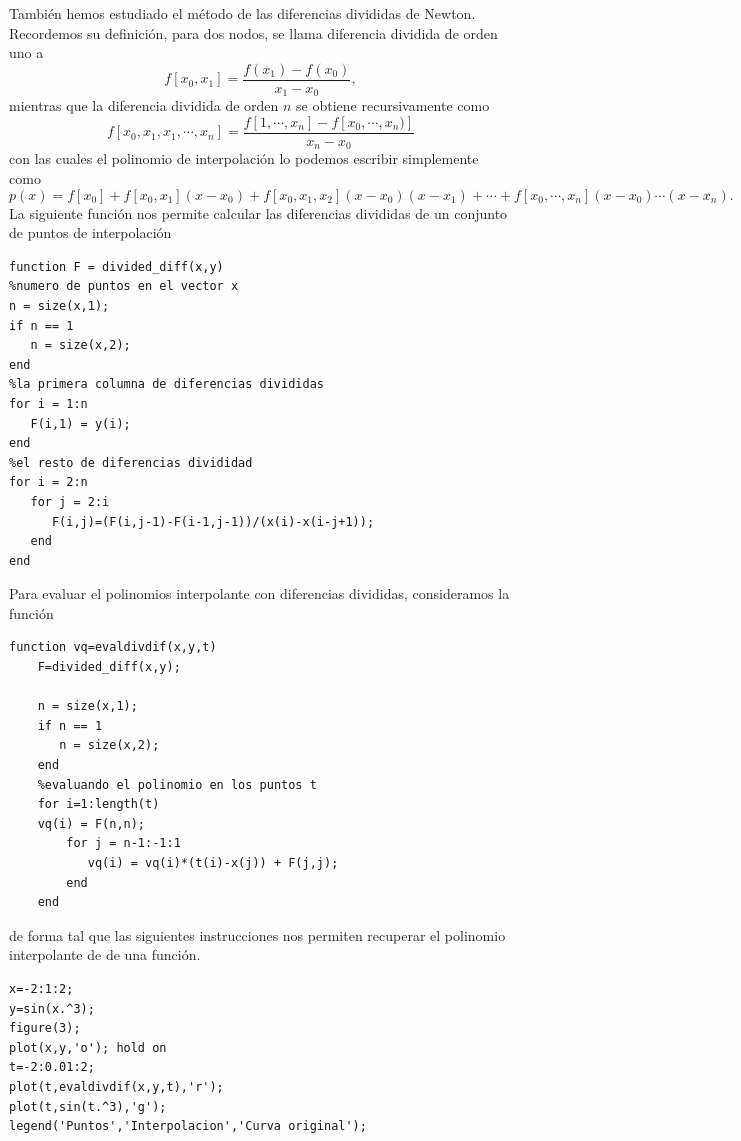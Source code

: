 \documentclass[11pt]{article}
\begin{document}
Tambi\'en hemos estudiado el m\'etodo de las diferencias divididas de Newton. Recordemos su definici\'on, para dos nodos, se llama diferencia dividida de orden uno a
$$
f[x_0,x_1]=\frac{f(x_1)-f(x_0)}{x_1-x_0},
$$
mientras que la diferencia dividida de orden $n$ se obtiene recursivamente como
$$
f[x_0,x_1,x_1,\cdots,x_n]=\frac{f[1,\cdots,x_n]-f[x_0,\cdots,x_n)]}{x_n-x_0}
$$
con las cuales el polinomio de interpolaci\'on lo podemos escribir simplemente como
$$
p(x)=f[x_0]+f[x_0,x_1](x-x_0)+f[x_0,x_1,x_2](x-x_0)(x-x_1)+ \cdots + f[x_0,\cdots,x_n](x-x_0)\cdots (x-x_n).
$$
La siguiente funci\'on nos permite calcular las diferencias divididas de un conjunto de puntos de interpolaci\'on
\begin{verbatim}
function F = divided_diff(x,y)
%numero de puntos en el vector x
n = size(x,1);
if n == 1
   n = size(x,2);
end
%la primera columna de diferencias divididas
for i = 1:n
   F(i,1) = y(i);
end
%el resto de diferencias divididad
for i = 2:n
   for j = 2:i
      F(i,j)=(F(i,j-1)-F(i-1,j-1))/(x(i)-x(i-j+1));
   end
end
\end{verbatim}
Para evaluar el polinomios interpolante con diferencias divididas, consideramos la funci\'on
\begin{verbatim}
function vq=evaldivdif(x,y,t)
    F=divided_diff(x,y);

	n = size(x,1);
    if n == 1
       n = size(x,2);
    end
    %evaluando el polinomio en los puntos t
    for i=1:length(t)
    vq(i) = F(n,n);
        for j = n-1:-1:1
           vq(i) = vq(i)*(t(i)-x(j)) + F(j,j);
        end
    end
\end{verbatim}
de forma tal que las siguientes instrucciones nos permiten recuperar el polinomio interpolante de de una funci\'on.
\begin{verbatim}
x=-2:1:2;
y=sin(x.^3);
figure(3);
plot(x,y,'o'); hold on
t=-2:0.01:2;
plot(t,evaldivdif(x,y,t),'r');
plot(t,sin(t.^3),'g');
legend('Puntos','Interpolacion','Curva original');
\end{verbatim}
\end{document}
